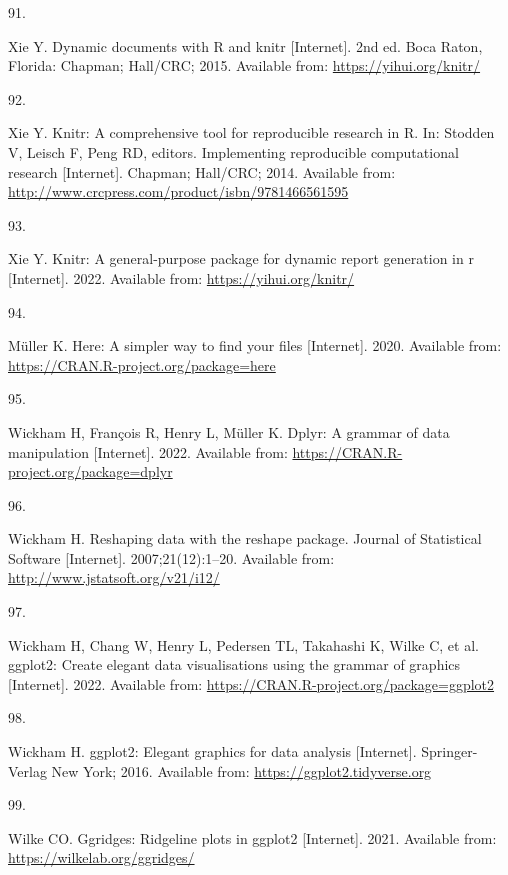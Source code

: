 \documentclass[10pt,a4paper]{article}
\newlength{\cslhangindent}
\newlength{\csllabelwidth}
\newlength{\cslentryspacingunit} %
\newenvironment{CSLReferences}[2] %
 {%
  \setlength{\parindent}{0pt}
  \ifodd #1
  \let\oldpar\par
  \def\par{\hangindent=\cslhangindent\oldpar}
  \fi
  \setlength{\parskip}{#2\cslentryspacingunit}
 }%
 {}
\newcommand{\CSLLeftMargin}[1]{\parbox[t]{\csllabelwidth}{#1}}
\newcommand{\CSLRightInline}[1]{\parbox[t]{\linewidth - \csllabelwidth}{#1}\break}
\begin{document}
\begin{CSLReferences}{0}{0}
\leavevmode{}%
\CSLLeftMargin{91. }
\CSLRightInline{Xie Y. Dynamic documents with {R} and knitr {[}Internet{]}. 2nd ed. Boca Raton, Florida: Chapman; Hall/CRC; 2015. Available from: \url{https://yihui.org/knitr/}}

\leavevmode{}%
\CSLLeftMargin{92. }
\CSLRightInline{Xie Y. Knitr: A comprehensive tool for reproducible research in {R}. In: Stodden V, Leisch F, Peng RD, editors. Implementing reproducible computational research {[}Internet{]}. Chapman; Hall/CRC; 2014. Available from: \url{http://www.crcpress.com/product/isbn/9781466561595}}

\leavevmode{}%
\CSLLeftMargin{93. }
\CSLRightInline{Xie Y. Knitr: A general-purpose package for dynamic report generation in r {[}Internet{]}. 2022. Available from: \url{https://yihui.org/knitr/}}

\leavevmode{}%
\CSLLeftMargin{94. }
\CSLRightInline{Müller K. Here: A simpler way to find your files {[}Internet{]}. 2020. Available from: \url{https://CRAN.R-project.org/package=here}}

\leavevmode{}%
\CSLLeftMargin{95. }
\CSLRightInline{Wickham H, François R, Henry L, Müller K. Dplyr: A grammar of data manipulation {[}Internet{]}. 2022. Available from: \url{https://CRAN.R-project.org/package=dplyr}}

\leavevmode{}%
\CSLLeftMargin{96. }
\CSLRightInline{Wickham H. Reshaping data with the {reshape} package. Journal of Statistical Software {[}Internet{]}. 2007;21(12):1--20. Available from: \url{http://www.jstatsoft.org/v21/i12/}}

\leavevmode{}%
\CSLLeftMargin{97. }
\CSLRightInline{Wickham H, Chang W, Henry L, Pedersen TL, Takahashi K, Wilke C, et al. ggplot2: Create elegant data visualisations using the grammar of graphics {[}Internet{]}. 2022. Available from: \url{https://CRAN.R-project.org/package=ggplot2}}

\leavevmode{}%
\CSLLeftMargin{98. }
\CSLRightInline{Wickham H. ggplot2: Elegant graphics for data analysis {[}Internet{]}. Springer-Verlag New York; 2016. Available from: \url{https://ggplot2.tidyverse.org}}

\leavevmode{}%
\CSLLeftMargin{99. }
\CSLRightInline{Wilke CO. Ggridges: Ridgeline plots in ggplot2 {[}Internet{]}. 2021. Available from: \url{https://wilkelab.org/ggridges/}}


\end{CSLReferences}
\end{document}
